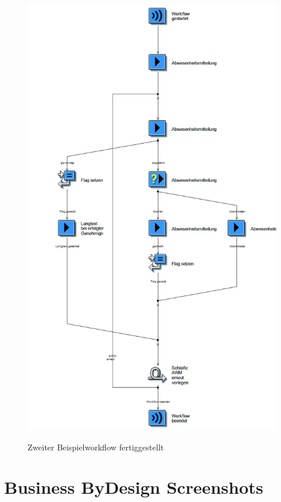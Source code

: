 \begin{figure}[H]
	\begin{center}
	\includegraphics[height=0.9\textheight]{grafiken/wf-builder_bsp2_complete.png}
	\caption{Zweiter Beispielworkflow fertiggestellt}
	\vspace{-10pt}
	\label{abb:workflow-bsp2-complete}
	\end{center}
\end{figure}

\section{Business ByDesign Screenshots}

